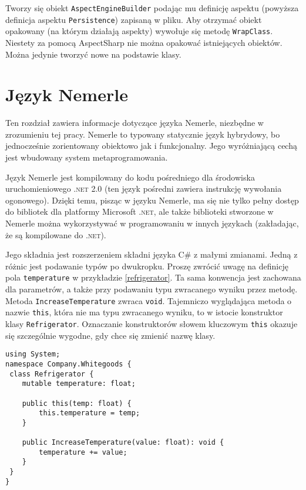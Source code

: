 \documentclass[a4paper,12pt]{mwbk}
\begin{document}
Tworzy się obiekt \lstinline^AspectEngineBuilder^ podając mu definicję aspektu
(powyższa definicja aspektu \lstinline^Persistence^) zapisaną w pliku. Aby
otrzymać obiekt opakowany (na którym działają aspekty) wywołuje się metodę
\lstinline^WrapClass^. Niestety za pomocą AspectSharp nie można opakować
istniejących obiektów. Można jedynie tworzyć nowe na podstawie klasy.


\chapter{Język Nemerle}


Ten rozdział zawiera informacje dotyczące języka Nemerle, niezbędne w zrozumieniu
tej pracy. Nemerle to typowany statycznie język hybrydowy,
bo jednocześnie zorientowany obiektowo jak i funkcjonalny.  Jego wyróżniającą
cechą jest wbudowany system metaprogramowania. 

Język Nemerle jest kompilowany do kodu pośredniego dla środowiska
uruchomieniowego \textsc{.net 2.0} (ten język pośredni zawiera instrukcję
wywołania ogonowego).  Dzięki temu, pisząc w języku Nemerle, ma się nie tylko
pełny dostęp do bibliotek dla platformy Microsoft \textsc{.net}, ale także
biblioteki stworzone w Nemerle można wykorzystywać w programowaniu w innych
językach (zakładając, że są kompilowane do \textsc{.net}).

Jego składnia jest rozszerzeniem składni języka C\# z małymi zmianami. Jedną 
z różnic jest podawanie typów po dwukropku. Proszę zwrócić uwagę na
definicję pola \lstinline!temperature! w przykładzie \ref{refrigerator}. Ta
sama konwencja jest zachowana dla parametrów, a także przy podawaniu typu
zwracanego wyniku przez metodę.  Metoda \lstinline!IncreaseTemperature! zwraca
\lstinline!void!. Tajemniczo wyglądająca metoda o nazwie \lstinline!this!,
która nie ma typu zwracanego wyniku, to w istocie konstruktor klasy
\lstinline!Refrigerator!. Oznaczanie konstruktorów słowem kluczowym
\lstinline!this! okazuje się szczególnie wygodne, gdy chce się zmienić nazwę
klasy.

\begin{lstlisting}[style=AspectJ,caption=Składnia klas w języku Nemerle,label=refrigerator]
using System;
namespace Company.Whitegoods {
 class Refrigerator {
    mutable temperature: float;

    public this(temp: float) {
        this.temperature = temp;
    }

    public IncreaseTemperature(value: float): void {
        temperature += value;
    }
 }
}
\end{lstlisting}
\end{document}
